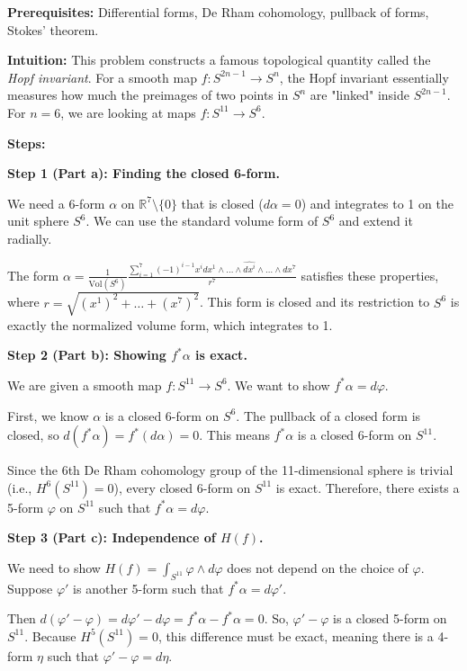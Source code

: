 \begin{solution}
\textbf{Prerequisites:} Differential forms, De Rham cohomology, pullback of forms, Stokes' theorem.

\textbf{Intuition:} This problem constructs a famous topological quantity called the \textit{Hopf invariant}. For a smooth map $f: S^{2n-1} \to S^n$, the Hopf invariant essentially measures how much the preimages of two points in $S^n$ are "linked" inside $S^{2n-1}$. For $n=6$, we are looking at maps $f: S^{11} \to S^6$.

\textbf{Steps:}

\textbf{Step 1 (Part a): Finding the closed 6-form.}

We need a 6-form $\alpha$ on $\mathbb{R}^{7} \setminus \{0\}$ that is closed ($d\alpha = 0$) and integrates to 1 on the unit sphere $S^6$. We can use the standard volume form of $S^6$ and extend it radially.

The form $\alpha = \frac{1}{\text{Vol}(S^6)} \frac{\sum_{i=1}^7 (-1)^{i-1} x^i dx^1 \wedge \dots \wedge \widehat{dx^i} \wedge \dots \wedge dx^7}{r^7}$ satisfies these properties, where $r = \sqrt{(x^1)^2 + \dots + (x^7)^2}$. This form is closed and its restriction to $S^6$ is exactly the normalized volume form, which integrates to 1.

\textbf{Step 2 (Part b): Showing $f^*\alpha$ is exact.}

We are given a smooth map $f: S^{11} \to S^6$. We want to show $f^*\alpha = d\varphi$.

First, we know $\alpha$ is a closed 6-form on $S^6$. The pullback of a closed form is closed, so $d(f^*\alpha) = f^*(d\alpha) = 0$. This means $f^*\alpha$ is a closed 6-form on $S^{11}$.

Since the 6th De Rham cohomology group of the 11-dimensional sphere is trivial (i.e., $H^6(S^{11}) = 0$), every closed 6-form on $S^{11}$ is exact. Therefore, there exists a 5-form $\varphi$ on $S^{11}$ such that $f^*\alpha = d\varphi$.

\textbf{Step 3 (Part c): Independence of $H(f)$.}

We need to show $H(f) = \int_{S^{11}} \varphi \wedge d\varphi$ does not depend on the choice of $\varphi$. Suppose $\varphi'$ is another 5-form such that $f^*\alpha = d\varphi'$.

Then $d(\varphi' - \varphi) = d\varphi' - d\varphi = f^*\alpha - f^*\alpha = 0$. So, $\varphi' - \varphi$ is a closed 5-form on $S^{11}$. Because $H^5(S^{11}) = 0$, this difference must be exact, meaning there is a 4-form $\eta$ such that $\varphi' - \varphi = d\eta$.


\end{solution}
